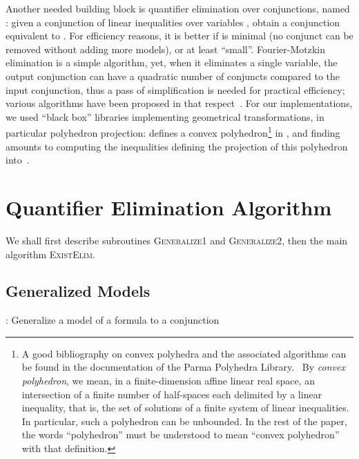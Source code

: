 Another needed building block is quantifier elimination over conjunctions, named : given a conjunction  of linear inequalities over variables , obtain a conjunction  equivalent to . For efficiency reasons, it is better if  is minimal (no conjunct can be removed without adding more models), or at least ``small''. Fourier-Motzkin elimination is a simple algorithm, yet, when it eliminates a single variable, the output conjunction can have a quadratic number of conjuncts compared to the input conjunction, thus a pass of simplification is needed for practical efficiency; various algorithms have been proposed in that respect~\cite{imbert93fouriers}.
For our implementations, we used ``black box'' libraries implementing
geometrical transformations, in particular polyhedron projection:  defines a convex polyhedron\footnote{A good bibliography on convex polyhedra and the associated algorithms can be found in the documentation of the Parma Polyhedra Library.~\cite{PPL} By \emph{convex polyhedron}, we mean, in a finite-dimension affine linear real space, an intersection of a finite number of half-spaces each delimited by a linear inequality, that is, the set of solutions of a finite system of linear inequalities. In particular, such a polyhedron can be unbounded. In the rest of the paper, the words ``polyhedron'' must be understood to mean ``convex polyhedron'' with that definition.} in , and finding  amounts to computing the inequalities defining the projection of this polyhedron into~.

\section{Quantifier Elimination Algorithm}
\label{part:algorithm}
We shall first describe subroutines \textsc{Generalize1} and \textsc{Generalize2}, then the main algorithm \textsc{ExistElim}.

\subsection{Generalized Models}

\begin{algorithm}
\caption{: Generalize a model  of a formula  to a conjunction}

\begin{algorithmic}
\REQUIRE{}
\STATE 
\FORALL {}
  \IF{}
    \STATE 
  \ELSE
    \STATE 
  \ENDIF
\ENDFOR
\ENSURE{}
\end{algorithmic}
\end{algorithm}


